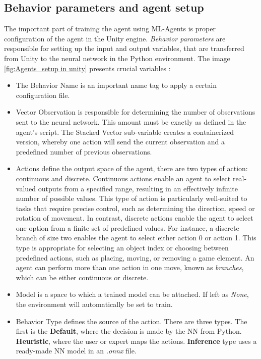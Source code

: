 
\subsection{Behavior parameters and agent setup}
The important part of training the agent using ML-Agents is proper configuration of the agent in the Unity engine. \textit{Behavior parameters} are responsible for setting up the input and output variables, that are transferred from Unity to the neural network in the Python environment. The image \ref{fig:Agents_setup in unity} presents crucial variables \cite{unitymlagents40}:
\begin{itemize}
	\item The Behavior Name is an important name tag to apply a certain configuration file.
	\item Vector Observation is responsible for determining the number of observations sent to the neural network. This amount must be exactly as defined in the agent's script. The Stacked Vector sub-variable creates a containerized version, whereby one action will send the current observation and a predefined number of previous observations.
	\item Actions define the output space of the agent, there are two types of action: continuous and discrete. Continuous actions enable an agent to select real-valued outputs from a specified range, resulting in an effectively infinite number of possible values. This type of action is particularly well-suited to tasks that require precise control, such as determining the direction, speed or rotation of movement. In contrast, discrete actions enable the agent to select one option from a finite set of predefined values. For instance, a discrete branch of size two enables the agent to select either action 0 or action 1. This type is appropriate for selecting an object index or choosing between predefined actions, such as placing, moving, or removing a game element. An agent can perform more than one action in one move, known as \textit{branches}, which can be either continuous or discrete.  
	\item Model is a space to which a trained model can be attached. If left as \textit{None}, the environment will automatically be set to train. 
	\item Behavior Type defines the source of the action. There are three types. The first is the \textbf{Default}, where the decision is made by the NN from Python. \textbf{Heuristic}, where the user or expert maps the actions. \textbf{Inference} type uses a ready-made NN model in an \textit{.onnx} file.
\end{itemize}

